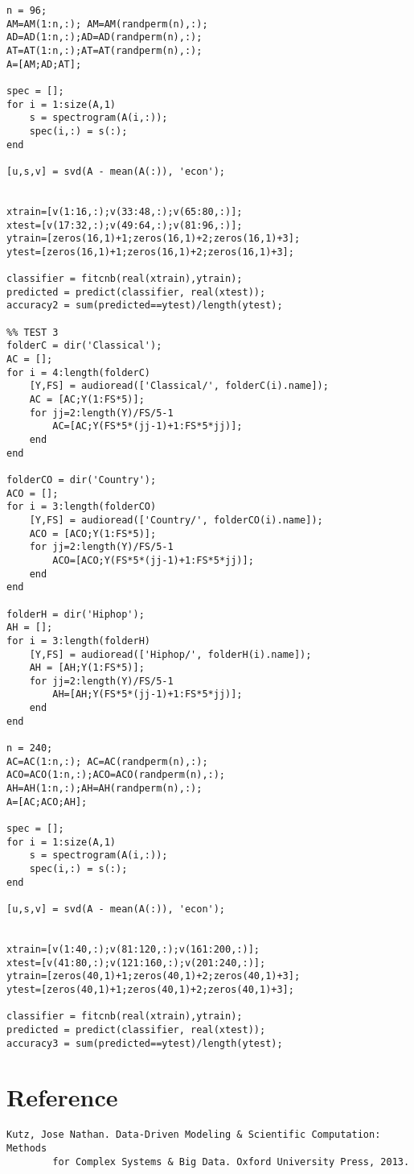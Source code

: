 \documentclass[12pt,letterpaper]{article}
\begin{document}
\begin{verbatim}
n = 96;
AM=AM(1:n,:); AM=AM(randperm(n),:);
AD=AD(1:n,:);AD=AD(randperm(n),:);
AT=AT(1:n,:);AT=AT(randperm(n),:);
A=[AM;AD;AT];

spec = [];
for i = 1:size(A,1)
    s = spectrogram(A(i,:));
    spec(i,:) = s(:);
end

[u,s,v] = svd(A - mean(A(:)), 'econ');


xtrain=[v(1:16,:);v(33:48,:);v(65:80,:)];
xtest=[v(17:32,:);v(49:64,:);v(81:96,:)];
ytrain=[zeros(16,1)+1;zeros(16,1)+2;zeros(16,1)+3];
ytest=[zeros(16,1)+1;zeros(16,1)+2;zeros(16,1)+3];

classifier = fitcnb(real(xtrain),ytrain);
predicted = predict(classifier, real(xtest));
accuracy2 = sum(predicted==ytest)/length(ytest);

%% TEST 3
folderC = dir('Classical');
AC = [];
for i = 4:length(folderC)
    [Y,FS] = audioread(['Classical/', folderC(i).name]);
    AC = [AC;Y(1:FS*5)];
    for jj=2:length(Y)/FS/5-1
        AC=[AC;Y(FS*5*(jj-1)+1:FS*5*jj)];
    end
end

folderCO = dir('Country');
ACO = [];
for i = 3:length(folderCO)
    [Y,FS] = audioread(['Country/', folderCO(i).name]);
    ACO = [ACO;Y(1:FS*5)];
    for jj=2:length(Y)/FS/5-1
        ACO=[ACO;Y(FS*5*(jj-1)+1:FS*5*jj)];
    end
end

folderH = dir('Hiphop');
AH = [];
for i = 3:length(folderH)
    [Y,FS] = audioread(['Hiphop/', folderH(i).name]);
    AH = [AH;Y(1:FS*5)];
    for jj=2:length(Y)/FS/5-1
        AH=[AH;Y(FS*5*(jj-1)+1:FS*5*jj)];
    end
end

n = 240;
AC=AC(1:n,:); AC=AC(randperm(n),:);
ACO=ACO(1:n,:);ACO=ACO(randperm(n),:);
AH=AH(1:n,:);AH=AH(randperm(n),:);
A=[AC;ACO;AH];

spec = [];
for i = 1:size(A,1)
    s = spectrogram(A(i,:));
    spec(i,:) = s(:);
end

[u,s,v] = svd(A - mean(A(:)), 'econ');


xtrain=[v(1:40,:);v(81:120,:);v(161:200,:)];
xtest=[v(41:80,:);v(121:160,:);v(201:240,:)];
ytrain=[zeros(40,1)+1;zeros(40,1)+2;zeros(40,1)+3];
ytest=[zeros(40,1)+1;zeros(40,1)+2;zeros(40,1)+3];

classifier = fitcnb(real(xtrain),ytrain);
predicted = predict(classifier, real(xtest));
accuracy3 = sum(predicted==ytest)/length(ytest);
\end{verbatim}
\section*{Reference}
\begin{verbatim}
Kutz, Jose Nathan. Data-Driven Modeling & Scientific Computation: Methods 
	    for Complex Systems & Big Data. Oxford University Press, 2013.
\end{verbatim}
\end{document}
